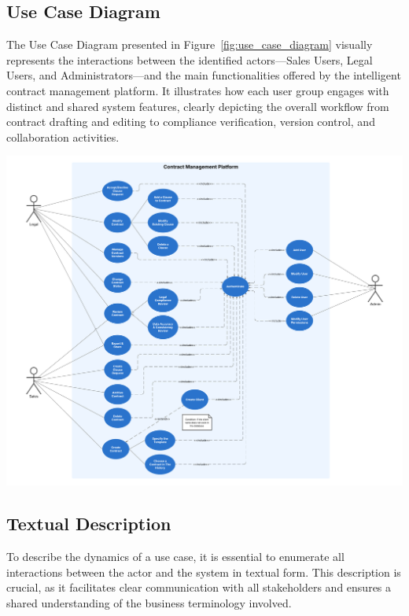 \subsection{Use Case Diagram}
The Use Case Diagram presented in Figure~\ref{fig:use_case_diagram} visually represents the interactions between the identified actors—Sales Users, Legal Users, and Administrators—and the main functionalities offered by the intelligent contract management platform. It illustrates how each user group engages with distinct and shared system features, clearly depicting the overall workflow from contract drafting and editing to compliance verification, version control, and collaboration activities.

\begin{center}
    \centering
    \includegraphics[width=1\textwidth]{Images/Use Case Diagram.png}
    \label{fig:use_case_diagram}
\end{center}

\subsection{Textual Description}

To describe the dynamics of a use case, it is essential to enumerate all interactions between the actor and the system in textual form. This description is crucial, as it facilitates clear communication with all stakeholders and ensures a shared understanding of the business terminology involved.

